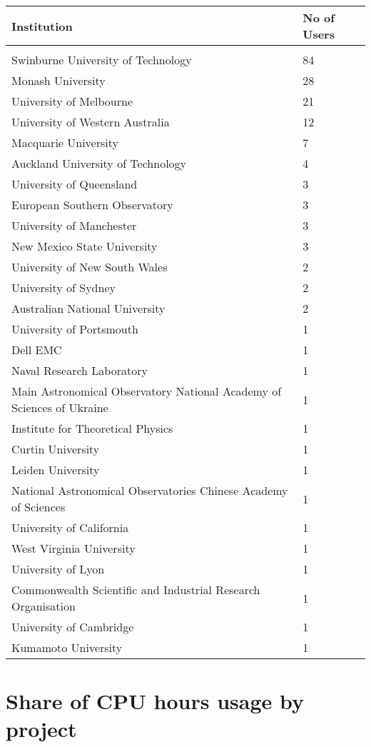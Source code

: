 \documentclass{article}%
\begin{document}
%
\begin{longtabu}{X[l] X[r]}%
\textbf{Institution}&\textbf{No of Users}\\%
\hline%
&\\%
Swinburne University of Technology&84\\%
\hline%
Monash University&28\\%
\hline%
University of Melbourne&21\\%
\hline%
University of Western Australia&12\\%
\hline%
Macquarie University&7\\%
\hline%
Auckland University of Technology&4\\%
\hline%
University of Queensland&3\\%
\hline%
European Southern Observatory&3\\%
\hline%
University of Manchester&3\\%
\hline%
New Mexico State University&3\\%
\hline%
University of New South Wales&2\\%
\hline%
University of Sydney&2\\%
\hline%
Australian National University&2\\%
\hline%
University of Portsmouth&1\\%
\hline%
Dell EMC&1\\%
\hline%
Naval Research Laboratory&1\\%
\hline%
Main Astronomical Observatory National Academy of Sciences of Ukraine&1\\%
\hline%
Institute for Theoretical Physics&1\\%
\hline%
Curtin University&1\\%
\hline%
Leiden University&1\\%
\hline%
National Astronomical Observatories Chinese Academy of Sciences&1\\%
\hline%
University of California&1\\%
\hline%
West Virginia University&1\\%
\hline%
University of Lyon&1\\%
\hline%
Commonwealth Scientific and Industrial Research Organisation&1\\%
\hline%
University of Cambridge&1\\%
\hline%
Kumamoto University&1\\%
\hline%
\end{longtabu}%
\section{Share of CPU hours usage by project}%
\end{document}

